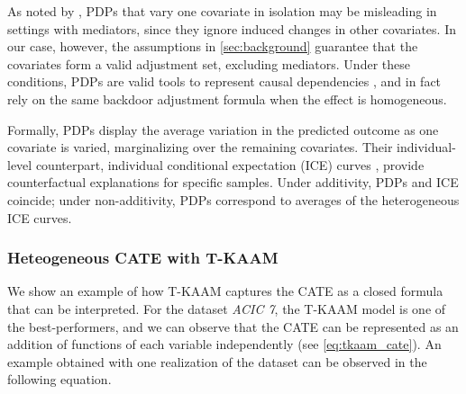 As noted by \citet{loftus2024causal}, PDPs that vary one covariate in isolation may be misleading in settings with mediators, since they ignore induced changes in other covariates. In our case, however, the assumptions in \cref{sec:background} guarantee that the covariates form a valid adjustment set, excluding mediators. Under these conditions, PDPs are valid tools to represent causal dependencies \citep{zhao2021causal}, and in fact rely on the same backdoor adjustment formula \citep{pearl2009causality} when the effect is homogeneous.  

Formally, PDPs display the average variation in the predicted outcome as one covariate is varied, marginalizing over the remaining covariates. Their individual-level counterpart, individual conditional expectation (ICE) curves \citep{goldstein2015peeking}, provide counterfactual explanations for specific samples. Under additivity, PDPs and ICE coincide; under non-additivity, PDPs correspond to averages of the heterogeneous ICE curves.


\subsubsection{Heteogeneous CATE with T-KAAM} 
\label{app:sec:results_visualizations_tkaam}
We show an example of how T-KAAM captures the CATE as a closed formula that can be interpreted. For the dataset \emph{ACIC 7}, the T-KAAM model is one of the best-performers, and we can observe that the CATE can be represented as an addition of functions of each variable independently (see \cref{eq:tkaam_cate}). An example obtained with one realization of the dataset can be observed in the following equation.

